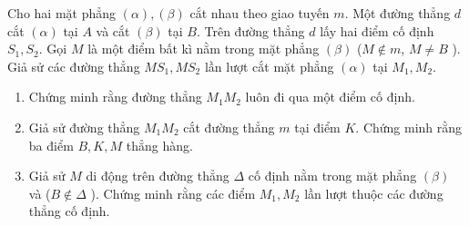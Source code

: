\begin{bt}
\begin{bt}%
	Cho hai mặt phẳng $(\alpha),(\beta)$ cắt nhau theo giao tuyến $m$. Một đường thẳng $d$ cắt $(\alpha)$ tại $A$ và cắt $(\beta)$ tại $B$. Trên đường thẳng $d$ lấy hai điểm cố định $S_1,S_2$. Gọi $M$ là một điểm bất kì nằm trong mặt phẳng $(\beta)$ ($M \notin m$, $M \ne B$ ). Giả sử các đường thẳng $MS_1,MS_2$ lần lượt cắt mặt phẳng $(\alpha)$ tại $M_1,M_2$.
	\begin{enumerate}
		\item Chứng minh rằng đường thẳng $M_1M_2$ luôn đi qua một điểm cố định.
		\item Giả sử đường thẳng $M_1M_2$ cắt đường thẳng $m$ tại điểm $K$. Chứng minh rằng ba điểm $B,K,M$ thẳng hàng.
		\item Giả sử $M$ di động trên đường thẳng $\Delta$ cố định nằm trong mặt phẳng $(\beta)$ và ($B \notin \Delta$ ). Chứng minh rằng các điểm $M_1,M_2$ lần lượt thuộc các đường thẳng cố định.
	\end{enumerate}
\end{bt}
\end{bt}
